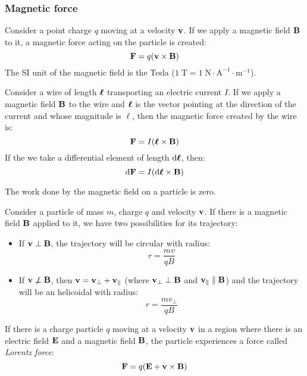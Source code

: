 \documentclass[../../../main.tex]{subfiles}
\begin{document}
\begin{multicols}{2}
  \subsubsection{Magnetic force}
  \begin{prop}
    Consider a point charge $q$ moving at a velocity $\boldsymbol{\mathrm{v}}$. If we apply a magnetic field $\boldsymbol{\mathrm{B}}$ to it, a magnetic force acting on the particle is created: $$\boldsymbol{\mathrm{F}}=q(\boldsymbol{\mathrm{v}}\times\boldsymbol{\mathrm{B}})$$ The SI unit of the magnetic field is the Tesla ($1\;\text{T}=1\;\text{N}\cdot\text{A}^{-1}\cdot\text{m}^{-1}$).
  \end{prop}
  \begin{prop}
    Consider a wire of length $\vb*{\ell}$ transporting an electric current $I$. If we apply a magnetic field $\boldsymbol{\mathrm{B}}$ to the wire and $\vb*{\ell}$ is the vector pointing at the direction of the current and whose magnitude is $\ell$, then the magnetic force created by the wire is: $$\boldsymbol{\mathrm{F}}=I(\vb*{\ell}\times\boldsymbol{\mathrm{B}})$$ If the we take a differential element of length $\dd\vb*{\ell}$, then: $$\dd \boldsymbol{\mathrm{F}}=I(\dd\vb*{\ell}\times\boldsymbol{\mathrm{B}})$$
  \end{prop}
  \begin{lemma}
    The work done by the magnetic field on a particle is zero.
  \end{lemma}
  \begin{prop}
    Consider a particle of mass $m$, charge $q$ and velocity $\boldsymbol{\mathrm{v}}$. If there is a magnetic field $\boldsymbol{\mathrm{B}}$ applied to it, we have two possibilities for its trajectory:
    \begin{itemize}
      \item If $\boldsymbol{\mathrm{v}}\perp\boldsymbol{\mathrm{B}}$, the trajectory will be circular with radius: $$r=\frac{mv}{qB}$$
      \item If $\boldsymbol{\mathrm{v}}\not\perp\boldsymbol{\mathrm{B}}$, then $\boldsymbol{\mathrm{v}}=\boldsymbol{\mathrm{v}}_\perp+\boldsymbol{\mathrm{v}}_\parallel$ (where $\boldsymbol{\mathrm{v}}_\perp\perp\boldsymbol{\mathrm{B}}$ and $\boldsymbol{\mathrm{v}}_\parallel\parallel\boldsymbol{\mathrm{B}}$) and the trajectory will be an helicoidal with radius: $$r=\frac{mv_\perp}{qB}$$
    \end{itemize}
  \end{prop}
  \begin{prop}
    If there is a charge particle $q$ moving at a velocity $\boldsymbol{\mathrm{v}}$ in a region where there is an electric field $\boldsymbol{\mathrm{E}}$ and a magnetic field $\boldsymbol{\mathrm{B}}$, the particle experiences a force called \textit{Lorentz force}: $$\boldsymbol{\mathrm{F}}=q(\boldsymbol{\mathrm{E}}+\boldsymbol{\mathrm{v}}\times\boldsymbol{\mathrm{B}})$$
  \end{prop}

\end{multicols}
\end{document}
